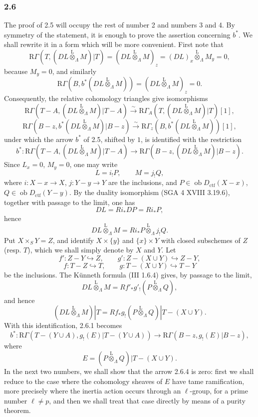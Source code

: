 \documentclass[11pt]{article}
\providecommand{\lten}{\overset{\mathrm L}{\otimes}}
\providecommand{\Ob}{\operatorname{ob}}
\begin{document}
\subsubsection*{2.6}
The proof of 2.5 will occupy the rest of number 2 and numbers 3 and 4. By symmetry of the statement, it is enough to prove the assertion concerning $b^*$. We shall rewrite it in a form which will be more convenient. First note that
\[
\mathrm R\Gamma(T,(DL\lten_{\Lambda}M)|T)
 =(DL\lten_{\Lambda}M)_z
 =(DL)_x\lten_{\Lambda}M_y=0,
\]
because $M_y=0$, and similarly
\[
\mathrm R\Gamma(B,b^*(DL\lten_{\Lambda}M))
 =(DL\lten_{\Lambda}M)_z=0.
\]
Consequently, the relative cohomology triangles give isomorphisms
\[
\mathrm R\Gamma(T-A,(DL\lten_{\Lambda}M)|T-A)
 \xrightarrow{\sim}
\mathrm R\Gamma_A(T,(DL\lten_{\Lambda}M)|T)[1],
\]
\[
\mathrm R\Gamma(B-z,b^*(DL\lten_{\Lambda}M)|B-z)
 \xrightarrow{\sim}
\mathrm R\Gamma_z(B,b^*(DL\lten_{\Lambda}M))[1],
\]
under which the arrow $b^*$ of 2.5, shifted by $1$, is identified with the restriction
\[
b^*:\mathrm R\Gamma(T-A,(DL\lten_{\Lambda}M)|T-A)
 \longrightarrow \mathrm R\Gamma(B-z,(DL\lten_{\Lambda}M)|B-z).
\tag{2.6.1}
\]
Since $L_x=0$, $M_y=0$, one may write
\[
L=i_!P,\qquad M=j_!Q,
\tag{2.6.2}
\]
where $i:X-x\to X$, $j:Y-y\to Y$ are the inclusions, and $P\in\Ob D_{\mathrm{ctf}}(X-x)$, $Q\in\Ob D_{\mathrm{ctf}}(Y-y)$. By the duality isomorphism (SGA 4 XVIII 3.19.6), together with passage to the limit, one has
\[
DL=Ri_*DP=Ri_*P,
\]
hence
\[
DL\lten_{\Lambda}M=Ri_*P\lten_{\Lambda}j_!Q.
\]
Put $X\times_SY=Z$, and identify $X\times\{y\}$ and $\{x\}\times Y$ with closed subschemes of $Z$ (resp. $T$), which we shall simply denote by $X$ and $Y$. Let
\[
f':Z-Y\hookrightarrow Z,\qquad
g':Z-(X\cup Y)\hookrightarrow Z-Y,
\]
\[
f:T-Z\hookrightarrow T,\qquad
g:T-(X\cup Y)\hookrightarrow T-Y
\]
be the inclusions. The Künneth formula (III 1.6.4) gives, by passage to the limit,
\[
DL\lten_{\Lambda}M=Rf'_*g'_!(P\lten_{\Lambda}Q),
\]
and hence
\[
(DL\lten_{\Lambda}M)|T=Rf_*g_!(P\lten_{\Lambda}Q)|T-(X\cup Y).
\tag{2.6.3}
\]
With this identification, 2.6.1 becomes
\[
b^*:\mathrm R\Gamma(T-(Y\cup A),g_!(E)|T-(Y\cup A))
 \longrightarrow \mathrm R\Gamma(B-z,g_!(E)|B-z),
\tag{2.6.4}
\]
where
\[
E=(P\lten_{\Lambda}Q)|T-(X\cup Y).
\]
In the next two numbers, we shall show that the arrow 2.6.4 is zero: first we shall reduce to the case where the cohomology sheaves of $E$ have tame ramification, more precisely where the inertia action occurs through an $\ell$-group, for a prime number $\ell\ne p$, and then we shall treat that case directly by means of a purity theorem.
\end{document}

